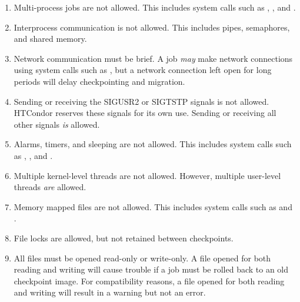 
\begin{enumerate}

\item Multi-process jobs are not allowed.  This includes system calls such as
, , and .

\item Interprocess communication is not allowed.  This includes pipes, semaphores, and shared memory.

\item Network communication must be brief.  A job \emph{may} make network
connections using system calls such as , but a network
connection left open for long periods will delay checkpointing and migration.

\item Sending or receiving the SIGUSR2 or SIGTSTP signals is not allowed.
HTCondor reserves these signals for its own use.  Sending or receiving all
other signals \emph{is} allowed.

\item Alarms, timers, and sleeping are not allowed.  This includes system
calls such as , , and .

\item Multiple kernel-level threads are not allowed.  However,
multiple user-level threads \emph{are} allowed.

\item Memory mapped files are not allowed.  This includes system calls such
as  and .

\item File locks are allowed, but not retained between checkpoints.

\item All files must be opened read-only or write-only.  A file opened
for both reading and writing will cause trouble if a job must be rolled back
to an old checkpoint image.  For compatibility reasons, a file opened
for both reading and writing will result in a warning but not an error.


\end{enumerate}

